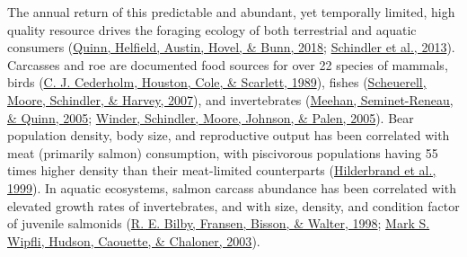 \documentclass [11pt, proquest] {uwthesis}[2015/03/03]
\begin{document}
The annual return of this predictable and abundant, yet temporally limited, high quality resource drives the foraging ecology of both terrestrial and aquatic consumers (\protect\hyperlink{ref-Quinn2018}{Quinn, Helfield, Austin, Hovel, \& Bunn, 2018}; \protect\hyperlink{ref-Schindler2013}{Schindler et al., 2013}). Carcasses and roe are documented food sources for over 22 species of mammals, birds (\protect\hyperlink{ref-Cederholm1989}{C. J. Cederholm, Houston, Cole, \& Scarlett, 1989}), fishes (\protect\hyperlink{ref-Scheuerell2007}{Scheuerell, Moore, Schindler, \& Harvey, 2007}), and invertebrates (\protect\hyperlink{ref-Meehan2005}{Meehan, Seminet-Reneau, \& Quinn, 2005}; \protect\hyperlink{ref-Winder2005}{Winder, Schindler, Moore, Johnson, \& Palen, 2005}). Bear population density, body size, and reproductive output has been correlated with meat (primarily salmon) consumption, with piscivorous populations having 55 times higher density than their meat-limited counterparts (\protect\hyperlink{ref-Hilderbrand1999}{Hilderbrand et al., 1999}). In aquatic ecosystems, salmon carcass abundance has been correlated with elevated growth rates of invertebrates, and with size, density, and condition factor of juvenile salmonids (\protect\hyperlink{ref-Bilby1998}{R. E. Bilby, Fransen, Bisson, \& Walter, 1998}; \protect\hyperlink{ref-Wipfli2003}{Mark S. Wipfli, Hudson, Caouette, \& Chaloner, 2003}).
\end{document}
